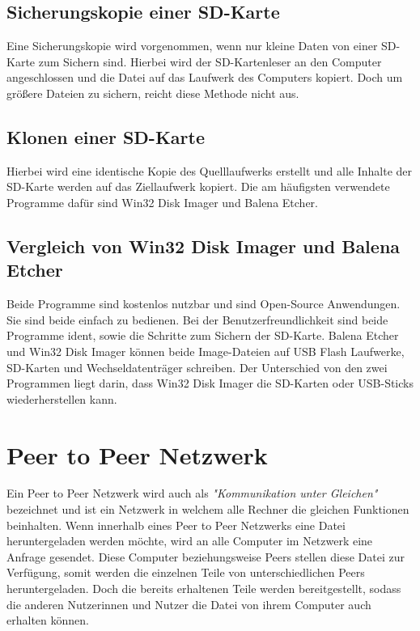 \subsection{Sicherungskopie einer SD-Karte}
Eine Sicherungskopie wird vorgenommen, wenn nur kleine Daten von einer SD-Karte zum Sichern sind. Hierbei wird der SD-Kartenleser an den Computer angeschlossen und die Datei auf das Laufwerk des Computers kopiert. Doch um größere Dateien zu sichern, reicht diese Methode nicht aus. \parencite{SD-KartenSicherung}

\subsection{Klonen einer SD-Karte}
Hierbei wird eine identische Kopie des Quelllaufwerks erstellt und alle Inhalte der SD-Karte werden auf das Ziellaufwerk kopiert. Die am häufigsten verwendete Programme dafür sind Win32 Disk Imager und Balena Etcher. \parencite{SD-KartenSicherung}

\subsection{Vergleich von Win32 Disk Imager und Balena Etcher}
Beide Programme sind kostenlos nutzbar und sind Open-Source Anwendungen. Sie sind beide einfach zu bedienen. Bei der Benutzerfreundlichkeit sind beide Programme ident, sowie die Schritte zum Sichern der SD-Karte. Balena Etcher und Win32 Disk Imager können beide Image-Dateien auf USB Flash Laufwerke, SD-Karten und Wechseldatenträger schreiben. Der Unterschied von den zwei Programmen liegt darin, dass Win32 Disk Imager die SD-Karten oder USB-Sticks wiederherstellen kann. \parencite{VergleichvonWin32DiskImagerundBalenaEtcher}

\section{Peer to Peer Netzwerk}
Ein Peer to Peer Netzwerk wird auch als \textit{"Kommunikation unter Gleichen"} bezeichnet und ist ein Netzwerk in welchem alle Rechner die gleichen Funktionen beinhalten. Wenn innerhalb eines Peer to Peer Netzwerks eine Datei heruntergeladen werden möchte, wird an alle Computer im Netzwerk eine Anfrage gesendet. Diese Computer beziehungsweise Peers stellen diese Datei zur Verfügung, somit werden die einzelnen Teile von unterschiedlichen Peers heruntergeladen. Doch die bereits erhaltenen Teile werden bereitgestellt, sodass die anderen Nutzerinnen und Nutzer die Datei von ihrem Computer auch erhalten können. \parencite{PeertoPeerNetzwerk}

